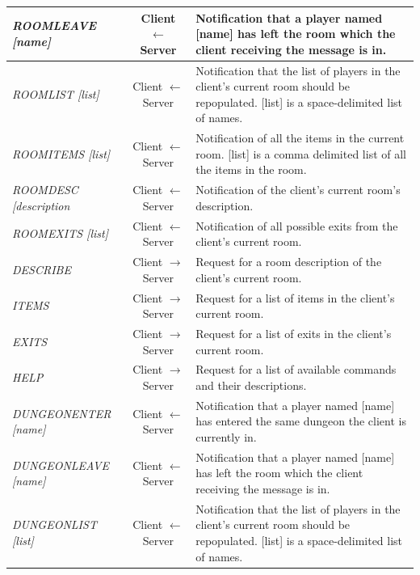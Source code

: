 \documentclass[a4paper]{article}
\begin{document}
\begin{appendices}
\begin{longtable}{|l|c|p{8 cm}|}
\hline
\textit{ROOMLEAVE [name]} & Client $\leftarrow$ Server & Notification that a player named [name] has left the room which the client receiving the message is in.\\
\hline
\textit{ROOMLIST [list]} & Client $\leftarrow$ Server & Notification that the list of players in the client's current room should be repopulated. [list] is a space-delimited list of names.\\
\hline
\textit{ROOMITEMS [list]} & Client $\leftarrow$ Server & Notification of all the items in the current room. [list] is a comma delimited list of all the items in the room.\\
\hline
\textit{ROOMDESC [description} & Client $\leftarrow$ Server & Notification of the client's current room's description.\\
\hline
\textit{ROOMEXITS [list]} & Client $\leftarrow$ Server & Notification of all possible exits from the client's current room.\\
\hline
\textit{DESCRIBE} & Client $\rightarrow$ Server & Request for a room description of the client's current room.\\
\hline
\textit{ITEMS} & Client $\rightarrow$ Server & Request for a list of items in the client's current room.\\
\hline
\textit{EXITS} & Client $\rightarrow$ Server & Request for a list of exits in the client's current room.\\
\hline
\textit{HELP} & Client $\rightarrow$ Server & Request for a list of available commands and their descriptions.\\
\hline
\textit{DUNGEONENTER [name]} & Client $\leftarrow$ Server & Notification that a player named [name] has entered the same dungeon the client is currently in.\\
\hline
\textit{DUNGEONLEAVE [name]} & Client $\leftarrow$ Server & Notification that a player named [name] has left the room which the client receiving the message is in.\\
\hline
\textit{DUNGEONLIST [list]} & Client $\leftarrow$ Server & Notification that the list of players in the client's current room should be repopulated. [list] is a space-delimited list of names.\\
\hline
\end{longtable}
\end{appendices}
\end{document}
